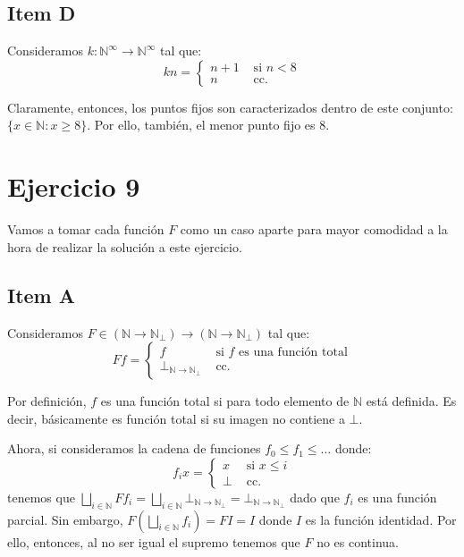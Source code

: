\documentclass{article}
\newcommand{\N}{\mathbb{N}}
\newcommand{\supr}{\bigsqcup\limits}
\begin{document}
\subsection*{Item D}
Consideramos $k : \N^\infty \to \N^\infty$ tal que:
\begin{equation*}
	k n = \begin{cases}
		n + 1 & \text{ si } n < 8 \\
		n     & \text{ cc. }
	\end{cases}
\end{equation*}

Claramente, entonces, los puntos fijos son caracterizados dentro de este conjunto: $\{x \in \N : x \geq 8\}$.
Por ello, también, el menor punto fijo es $8$.

\section*{Ejercicio 9}
Vamos a tomar cada función $F$ como un caso aparte para mayor comodidad a la hora de realizar la solución a este ejercicio.

\subsection*{Item A}
Consideramos $F \in (\N \to \N_\bot) \to (\N \to \N_\bot)$ tal que:
\begin{equation*}
	F f = \begin{cases}
		f                     & \text{ si } f \text{ es una función total} \\
		\bot_{\N \to \N_\bot} & \text{ cc. }
	\end{cases}
\end{equation*}

Por definición, $f$ es una función total si para todo elemento de $\N$ está definida.
Es decir, básicamente es función total si su imagen no contiene a $\bot$.

Ahora, si consideramos la cadena de funciones $f_0 \leq f_1 \leq \dots$ donde:
\begin{equation*}
	f_i x = \begin{cases}
		x    & \text{ si } x \leq i \\
		\bot & \text{ cc. }
	\end{cases}
\end{equation*}
tenemos que $\supr_{i \in \N} F f_i = \supr_{i \in \N} \bot_{\N \to \N_\bot} = \bot_{\N \to \N_\bot}$ dado que $f_i$ es una función parcial.
Sin embargo, $F\left(\supr_{i \in \N} f_i\right) = F I = I$ donde $I$ es la función identidad.
Por ello, entonces, al no ser igual el supremo tenemos que $F$ no es continua.
\end{document}
